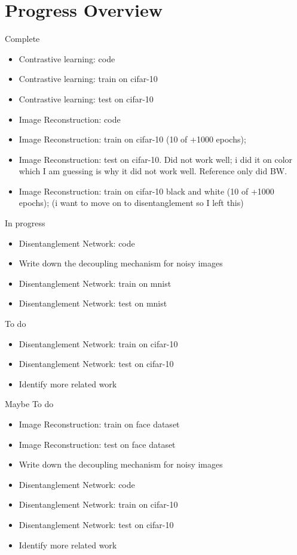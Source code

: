 \documentclass[11pt]{article}
\begin{document}
\section{Progress Overview}

Complete

\begin{itemize}
\item Contrastive learning: code
\item Contrastive learning: train on cifar-10
\item Contrastive learning: test on cifar-10
\item Image Reconstruction: code
\item Image Reconstruction: train on cifar-10  (10 of +1000 epochs); 
\item Image Reconstruction: test on cifar-10. Did not work well; i did it on color which I am guessing is why it did not work well. Reference only did BW.
\item Image Reconstruction: train on cifar-10 black and white  (10 of +1000 epochs); (i want to move on to disentanglement so I left this)
\end{itemize}

In progress

\begin{itemize}
\item Disentanglement Network: code
\item Write down the decoupling mechanism for noisy images
\item Disentanglement Network: train on mnist
\item Disentanglement Network: test on mnist
\end{itemize}


To do

\begin{itemize}
\item Disentanglement Network: train on cifar-10
\item Disentanglement Network: test on cifar-10
\item Identify more related work
\end{itemize}

Maybe To do 

\begin{itemize}
\item Image Reconstruction: train on face dataset
\item Image Reconstruction: test on face dataset
\item Write down the decoupling mechanism for noisy images
\item Disentanglement Network: code
\item Disentanglement Network: train on cifar-10
\item Disentanglement Network: test on cifar-10
\item Identify more related work
\end{itemize}
\end{document}
